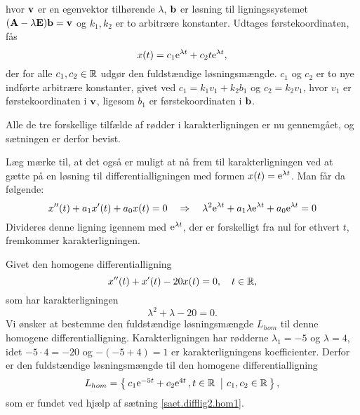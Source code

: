 \begin{bevis}
\begin{equation}
\end{equation}
hvor $ \mathbf{v} $ er en egenvektor tilhørende $ \lambda $, $ \mathbf{b} $ er løsning til ligningssystemet $ (\mathbf{A} - \lambda \mathbf{E})\mathbf{b} = \mathbf{v} $ og $ k_1,k_2 $ er to arbitrære konstanter. Udtages førstekoordinaten, fås
\begin{equation}
x(t) = c_1 \mathrm{e}^{\lambda t} + c_2 t \mathrm{e}^{\lambda t},
\end{equation}
der for alle $ c_1,c_2 \in \mathbb{R} $ udgør den fuldstændige løsningsmængde. $ c_1 $ og $ c_2 $ er to nye indførte arbitrære konstanter, givet ved $ c_1 = k_1 v_1 + k_2 b_1 $ og $ c_2 = k_2 v_1 $, hvor $ v_1 $ er førstekoordinaten i $ \mathbf{v} $, ligesom $ b_1 $ er førstekoordinaten i $ \mathbf{b} $.

Alle de tre forskellige tilfælde af rødder i karakterligningen er nu gennemgået, og sætningen er derfor bevist. 

\begin{info}
Læg mærke til, at det også er muligt at nå frem til karakterligningen ved at gætte på en løsning til differentialligningen med formen $ x(t) = \mathrm{e}^{\lambda t} $. Man får da følgende:
\begin{equation}
x''(t) + a_1x'(t) + a_0x(t) = 0 \quad \Rightarrow \quad \lambda^2 \mathrm{e}^{\lambda t} + a_1 \lambda \mathrm{e}^{\lambda t} + a_0 \mathrm{e}^{\lambda t} = 0
\end{equation}
Divideres denne ligning igennem med $ \mathrm{e}^{\lambda t} $, der er forskelligt fra nul for ethvert $ t $, fremkommer karakterligningen. 
\end{info}

\end{bevis}

\begin{example} \label{eks.difflig2.hom11}
Givet den homogene differentialligning
\begin{equation}
x''(t) + x'(t) - 20x(t) = 0, \quad t \in \mathbb{R},
\end{equation}
som har karakterligningen
\begin{equation}
\lambda^2 + \lambda - 20 = 0.
\end{equation}
Vi ønsker at bestemme den fuldstændige løsningsmængde $ L_{hom} $ til denne homogene differentialligning. \bs
Karakterligningen har rødderne $ \lambda_1 = -5 $ og $ \lambda = 4 $, idet $ -5 \cdot 4 = -20 $ og $ -(-5+4) = 1 $ er karakterligningens koefficienter. Derfor er den fuldstændige løsningsmængde til den homogene differentialligning
\begin{equation}
L_{hom} = \left\lbrace \hspace*{-1mm} \begin{array}{c|c} c_1 \mathrm{e}^{-5 t} + c_2 \mathrm{e}^{4 t}\,,t \in \mathbb{R}\, & c_1,c_2 \in \mathbb{R} \end{array} \hspace*{-1mm} \right\rbrace,
\end{equation}
som er fundet ved hjælp af sætning \ref{saet.difflig2.hom1}.
\end{example}

